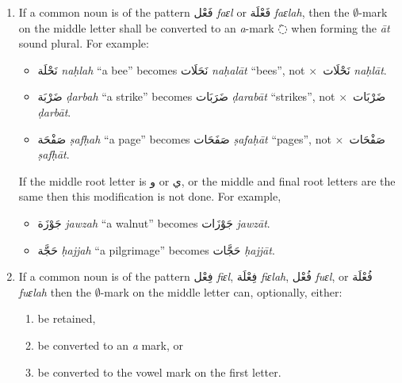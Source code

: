 \documentclass[
  10pt,
]{book}
\providecommand{\tightlist}{%
  \setlength{\itemsep}{0pt}\setlength{\parskip}{0pt}}
\begin{document}
\begin{enumerate}
\def\labelenumi{\arabic{enumi}.}
\item
  If a common noun is of the pattern \foreignlanguage{arabic}{فَعْل} \emph{faɛl} or \foreignlanguage{arabic}{فَعْلَة} \emph{faɛlah}, then the \(\emptyset\)-mark on the middle letter shall be converted to an \emph{a}-mark \foreignlanguage{arabic}{◌َ} when forming the \emph{āt} sound plural. For example:

  \begin{itemize}
  \tightlist
  \item
    \foreignlanguage{arabic}{نَحْلَة} \emph{naḥlah} \enquote{a bee} becomes \foreignlanguage{arabic}{نَحَلَات} \emph{naḥalāt} \enquote{bees}, not \(\times\)~\foreignlanguage{arabic}{نَحْلَات} \emph{naḥlāt}.
  \item
    \foreignlanguage{arabic}{ضَرْبَة} \emph{ḍarbah} \enquote{a strike} becomes \foreignlanguage{arabic}{ضَرَبَات} \emph{ḍarabāt} \enquote{strikes}, not \(\times\)~\foreignlanguage{arabic}{ضَرْبَات} \emph{ḍarbāt}.
  \item
    \foreignlanguage{arabic}{صَفْحَة} \emph{ṣafḥah} \enquote{a page} becomes \foreignlanguage{arabic}{صَفَحَات} \emph{ṣafaḥāt} \enquote{pages}, not \(\times\)~\foreignlanguage{arabic}{صَفْحَات} \emph{ṣafḥāt}.
  \end{itemize}

  If the middle root letter is \foreignlanguage{arabic}{و} or \foreignlanguage{arabic}{ي}, or the middle and final root letters are the same then this modification is not done. For example,

  \begin{itemize}
  \tightlist
  \item
    \foreignlanguage{arabic}{جَوْزَة} \emph{jawzah} \enquote{a walnut} becomes \foreignlanguage{arabic}{جَوْزَات} \emph{jawzāt}.
  \item
    \foreignlanguage{arabic}{حَجَّة} \emph{ḥajjah} \enquote{a pilgrimage} becomes \foreignlanguage{arabic}{حَجَّات} \emph{ḥajjāt}.
  \end{itemize}
\item
  If a common noun is of the pattern \foreignlanguage{arabic}{فِعْل} \emph{fiɛl}, \foreignlanguage{arabic}{فِعْلَة} \emph{fiɛlah}, \foreignlanguage{arabic}{فُعْل} \emph{fuɛl}, or \foreignlanguage{arabic}{فُعْلَة} \emph{fuɛlah} then the \(\emptyset\)-mark on the middle letter can, optionally, either:

  \begin{enumerate}
  \def\labelenumii{\roman{enumii}.}
  \tightlist
  \item
    be retained,
  \item
    be converted to an \emph{a} mark, or
  \item
    be converted to the vowel mark on the first letter.
  \end{enumerate}


\end{enumerate}
\end{document}
